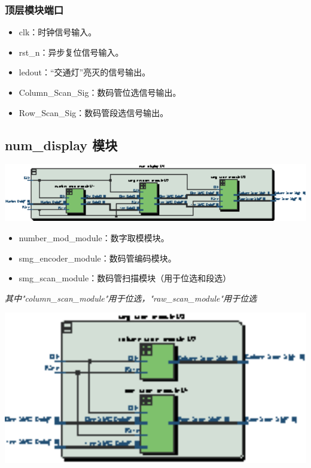 \documentclass[12pt,a4paper]{article}
\begin{document}
		\subsubsection{顶层模块端口}
			\begin{itemize}
				\item clk：时钟信号输入。
				\item rst\_n：异步复位信号输入。
				\item ledout：“交通灯”亮灭的信号输出。
				\item Column\_Scan\_Sig：数码管位选信号输出。
				\item Row\_Scan\_Sig：数码管段选信号输出。
			\end{itemize}
		\subsection{num\_display 模块}
		\begin{center}
				\includegraphics[width=16cm]{pic/pdf/numdisplay.eps}
		\end{center}
		\begin{itemize}
			\item number\_mod\_module：数字取模模块。
			\item smg\_encoder\_module：数码管编码模块。
			\item smg\_scan\_module：数码管扫描模块（用于位选和段选）
		\end{itemize}
		
			\emph{其中"column\_scan\_module"用于位选，"raw\_scan\_module"用于位选}
			
			\begin{center}
				\includegraphics[width=15cm]{pic/pdf/smgscan.eps}
			\end{center}
\end{document}
